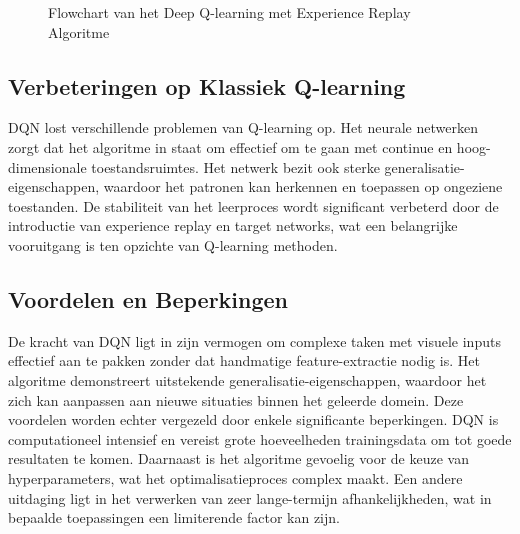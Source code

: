 \documentclass[a4paper,12pt]{report}
\begin{document}
\begin{figure}
    \caption{Flowchart van het Deep Q-learning met Experience Replay Algoritme}
    \label{fig:dqn_flowchart}
\end{figure}
\subsection{Verbeteringen op Klassiek Q-learning}
DQN lost verschillende problemen van Q-learning op. Het neurale netwerken zorgt
dat het algoritme in staat om effectief om te gaan met continue en
hoog-dimensionale toestandsruimtes. Het netwerk bezit ook sterke
generalisatie-eigenschappen, waardoor het patronen kan herkennen en toepassen
op ongeziene toestanden. De stabiliteit van het leerproces wordt significant
verbeterd door de introductie van experience replay en target networks, wat een
belangrijke vooruitgang is ten opzichte van Q-learning methoden.

\subsection{Voordelen en Beperkingen}
De kracht van DQN ligt in zijn vermogen om complexe taken met visuele inputs
effectief aan te pakken zonder dat handmatige feature-extractie nodig is. Het
algoritme demonstreert uitstekende generalisatie-eigenschappen, waardoor het
zich kan aanpassen aan nieuwe situaties binnen het geleerde domein. Deze
voordelen worden echter vergezeld door enkele significante beperkingen. DQN is
computationeel intensief en vereist grote hoeveelheden trainingsdata om tot
goede resultaten te komen. Daarnaast is het algoritme gevoelig voor de keuze
van hyperparameters, wat het optimalisatieproces complex maakt. Een andere
uitdaging ligt in het verwerken van zeer lange-termijn afhankelijkheden, wat in
bepaalde toepassingen een limiterende factor kan zijn.
\end{document}
